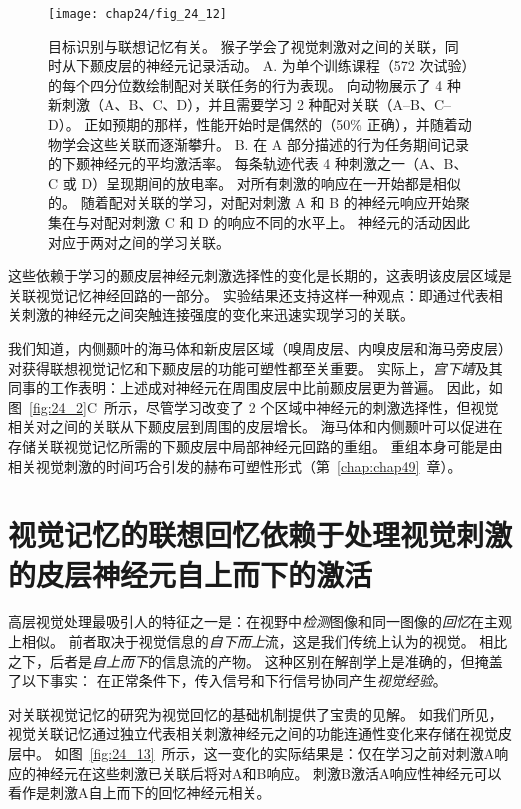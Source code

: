 \begin{figure}[htbp]
	\centering
	\texttt{[image: chap24/fig\_24\_12]}
	\caption{目标识别与联想记忆有关。
		猴子学会了视觉刺激对之间的关联，同时从下颞皮层的神经元记录活动。
		A. 为单个训练课程（572 次试验）的每个四分位数绘制配对关联任务的行为表现。
		向动物展示了 4 种新刺激（A、B、C、D），并且需要学习 2 种配对关联（A–B、C–D）。
		正如预期的那样，性能开始时是偶然的（50\% 正确），并随着动物学会这些关联而逐渐攀升。
		B. 在 A 部分描述的行为任务期间记录的下颞神经元的平均激活率。
		每条轨迹代表 4 种刺激之一（A、B、C 或 D）呈现期间的放电率。
		对所有刺激的响应在一开始都是相似的。
		随着配对关联的学习，对配对刺激 A 和 B 的神经元响应开始聚集在与对配对刺激 C 和 D 的响应不同的水平上。
		神经元的活动因此对应于两对之间的学习关联。}
	\label{fig:24_12}
\end{figure}


这些依赖于学习的颞皮层神经元刺激选择性的变化是长期的，这表明该皮层区域是关联视觉记忆神经回路的一部分。
实验结果还支持这样一种观点：即通过代表相关刺激的神经元之间突触连接强度的变化来迅速实现学习的关联。


我们知道，内侧颞叶的海马体和新皮层区域（嗅周皮层、内嗅皮层和海马旁皮层）对获得联想视觉记忆和下颞皮层的功能可塑性都至关重要。
实际上，\textit{宫下靖}及其同事的工作表明：上述成对神经元在周围皮层中比前颞皮层更为普遍\cite{miyashita1993inferior}。
因此，如图~\ref{fig:24_2}C~所示，尽管学习改变了 2 个区域中神经元的刺激选择性，但视觉相关对之间的关联从下颞皮层到周围的皮层增长。
海马体和内侧颞叶可以促进在存储关联视觉记忆所需的下颞皮层中局部神经元回路的重组。
重组本身可能是由相关视觉刺激的时间巧合引发的赫布可塑性形式（第~\ref{chap:chap49}~章）。



\section{视觉记忆的联想回忆依赖于处理视觉刺激的皮层神经元自上而下的激活}

高层视觉处理最吸引人的特征之一是：在视野中\textit{检测}图像和同一图像的\textit{回忆}在主观上相似。
前者取决于视觉信息的\textit{自下而上}流，这是我们传统上认为的视觉。
相比之下，后者是\textit{自上而下}的信息流的产物。
这种区别在解剖学上是准确的，但掩盖了以下事实：
在正常条件下，传入信号和下行信号协同产生\textit{视觉经验}。


对关联视觉记忆的研究为视觉回忆的基础机制提供了宝贵的见解。
如我们所见，视觉关联记忆通过独立代表相关刺激神经元之间的功能连通性变化来存储在视觉皮层中。
如图~\ref{fig:24_13}~所示，这一变化的实际结果是：仅在学习之前对刺激A响应的神经元在这些刺激已关联后将对A和B响应。
刺激B激活A响应性神经元可以看作是刺激A自上而下的回忆神经元相关。



